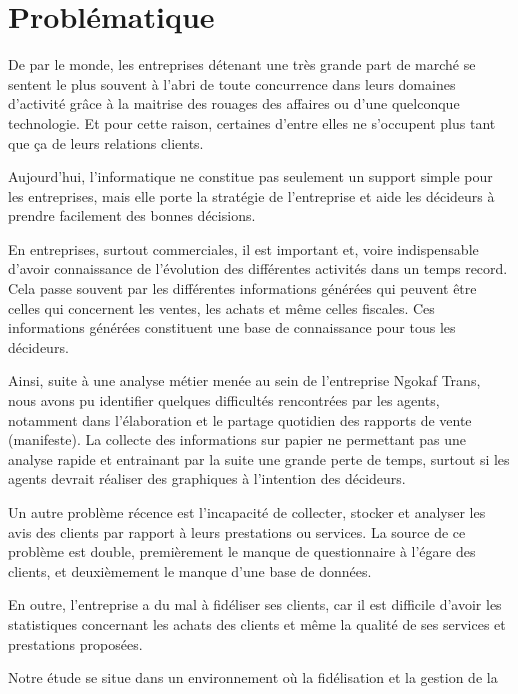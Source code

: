     \section[Problématique]{Problématique}
    De par le monde, les entreprises détenant une très grande part de marché
    se sentent le plus souvent à l’abri de toute concurrence
    dans leurs domaines d’activité grâce à la maitrise des rouages des affaires
    ou d’une quelconque technologie. \cite*{Rouviere2010} Et pour cette raison,
    certaines d’entre elles ne s’occupent plus tant que ça de leurs relations clients.
    \par
    Aujourd’hui, l’informatique ne constitue pas seulement un support simple pour les
    entreprises, mais elle porte la stratégie de l’entreprise et aide les décideurs à prendre
    facilement des bonnes décisions.
    \par
    En entreprises, surtout commerciales, il est important et, voire indispensable
    d’avoir connaissance de l’évolution des différentes activités dans un temps record. Cela
    passe souvent par les différentes informations générées qui peuvent être celles qui
    concernent les ventes, les achats et même celles fiscales. Ces informations générées
    constituent une base de connaissance pour tous les décideurs.
    \par
    Ainsi, suite à une analyse métier menée au sein de l’entreprise Ngokaf Trans,
    nous avons pu identifier quelques difficultés rencontrées par les agents,
    notamment dans l’élaboration et le partage quotidien des rapports de vente (manifeste). 
    La collecte des informations sur papier ne permettant pas une analyse rapide et 
    entrainant par la suite une grande perte de temps, surtout si les agents devrait réaliser
    des graphiques à l’intention des décideurs.
    \par
    Un autre problème récence est 
    l’incapacité de collecter, stocker et analyser les avis des clients par rapport à leurs prestations
    ou services. La source de ce problème est double, premièrement
    le manque de questionnaire à l’égare des clients, et deuxièmement
    le manque d’une base de données.
    \par
    En outre, l’entreprise a du mal à fidéliser ses clients, car il est difficile d’avoir les
    statistiques concernant les achats des clients et même la qualité de ses services et prestations
    proposées.
    \par
    Notre étude se situe dans un environnement où la fidélisation et la gestion de la
